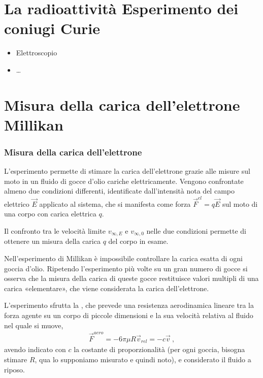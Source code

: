 \documentclass[letterpaper,10pt,italian]{jupyterBook}
\begin{document}
\section{La radioattività \sphinxhyphen{} Esperimento dei coniugi Curie}
\label{\detokenize{ch/modern/experiments:la-radioattivita-esperimento-dei-coniugi-curie}}\begin{itemize}
\item {} 
\sphinxAtStartPar
Elettroscopio {\hyperref[\detokenize{ch/electromagnetism/thermoelectric-effects:physics-hs-modern-intro-experiences-piezoel}]{}}

\item {} 
\sphinxAtStartPar
…

\end{itemize}


\section{Misura della carica dell’elettrone \sphinxhyphen{} Millikan}
\label{\detokenize{ch/modern/experiments:misura-della-carica-dell-elettrone-millikan}}\subsubsection*{Misura della carica dell’elettrone}

\sphinxAtStartPar
L’esperimento permette di stimare la carica dell’elettrone grazie alle misure sul moto in un fluido di gocce d’olio cariche elettricamente. Vengono confrontate almeno due condizioni differenti, identificate dall’intensità nota del campo elettrico \(\vec{E}\) applicato al sistema, che si manifesta come forza  \(\vec{F}^{el} = q \vec{E}\) sul moto di una corpo con carica elettrica \(q\).

\sphinxAtStartPar
Il confronto tra le velocità limite \(v_{\infty,E}\) e \(v_{\infty,0}\) nelle due condizioni permette di ottenere un misura della carica \(q\) del corpo in esame.

\sphinxAtStartPar
Nell’esperimento di Millikan è impossibile controllare la carica esatta di ogni goccia d’olio. Ripetendo l’esperimento più volte su un gran numero di gocce si osserva che la misura della carica di queste gocce restituisce valori multipli di una carica «elementare», che viene considerata la carica dell’elettrone.

\sphinxAtStartPar
L’esperimento sfrutta la {\hyperref[\detokenize{ch/continuum/intro:fluids-dynamics-stokes}]{}}, che prevede una resistenza aerodinamica lineare tra la forza agente su un corpo di piccole dimensioni e la sua velocità relativa al fluido nel quale si muove,
\begin{equation*}
\begin{split}\vec{F}^{aero} = - 6 \pi \mu R \vec{v}_{rel} = - c \vec{v} \ ,\end{split}
\end{equation*}
\sphinxAtStartPar
avendo indicato con \(c\) la costante di proporzionalità (per ogni goccia, bisogna stimare \(R\), qua lo supponiamo misurato e quindi noto), e considerato il fluido a riposo.
\end{document}
